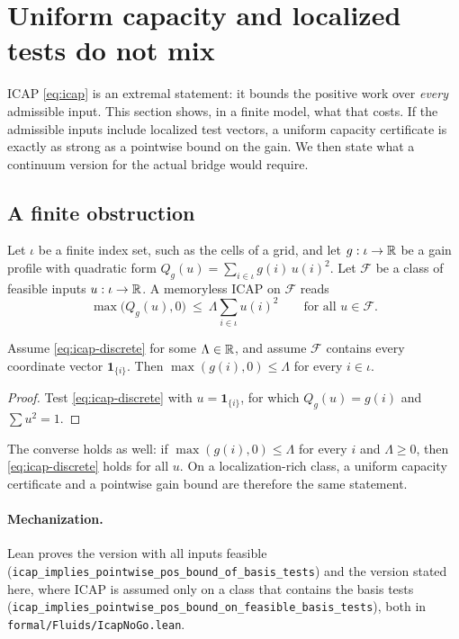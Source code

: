 \section{Uniform capacity and localized tests do not mix}
\label{sec:no-go-icap}

ICAP \eqref{eq:icap} is an extremal statement: it bounds the positive work over \emph{every}
admissible input. This section shows, in a finite model, what that costs. If the admissible inputs
include localized test vectors, a uniform capacity certificate is exactly as strong as a pointwise
bound on the gain. We then state what a continuum version for the actual bridge would require.

\subsection{A finite obstruction}

Let $\iota$ be a finite index set, such as the cells of a grid, and let $g:\iota\to\mathbb{R}$ be a gain
profile with quadratic form $Q_g(u)=\sum_{i\in\iota}g(i)\,u(i)^2$. Let $\mathcal F$ be a class of
feasible inputs $u:\iota\to\mathbb{R}$. A memoryless ICAP on $\mathcal F$ reads
\begin{equation}\label{eq:icap-discrete}
\max\bigl(Q_g(u),0\bigr)\ \le\ \Lambda\sum_{i\in\iota}u(i)^2\qquad\text{for all }u\in\mathcal F .
\end{equation}

\begin{theorem}\label{thm:icap-no-go}
Assume \eqref{eq:icap-discrete} for some $\Lambda\in\mathbb{R}$, and assume $\mathcal F$ contains every
coordinate vector $\mathbf 1_{\{i\}}$. Then $\max(g(i),0)\le\Lambda$ for every $i\in\iota$.
\end{theorem}

\begin{proof}
Test \eqref{eq:icap-discrete} with $u=\mathbf 1_{\{i\}}$, for which $Q_g(u)=g(i)$ and $\sum u^2=1$.
\end{proof}

The converse holds as well: if $\max(g(i),0)\le\Lambda$ for every $i$ and $\Lambda\ge0$, then
\eqref{eq:icap-discrete} holds for all $u$. On a localization-rich class, a uniform capacity
certificate and a pointwise gain bound are therefore the same statement.

\paragraph{Mechanization.}
Lean proves the version with all inputs feasible
(\nolinkurl{icap_implies_pointwise_pos_bound_of_basis_tests}) and the version stated here, where
ICAP is assumed only on a class that contains the basis tests
(\nolinkurl{icap_implies_pointwise_pos_bound_on_feasible_basis_tests}), both in
\nolinkurl{formal/Fluids/IcapNoGo.lean}.

